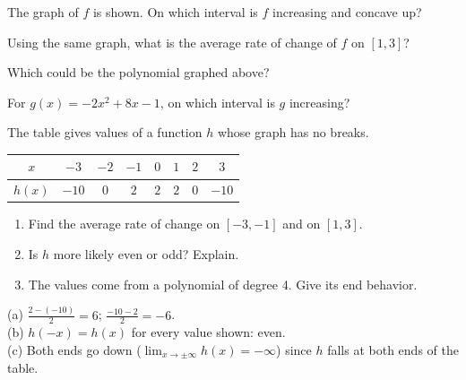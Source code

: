 \begin{exo}{}
The graph of $f$ is shown. On which interval is $f$ increasing and concave up?
\end{exo}
\begin{exo}{}
Using the same graph, what is the average rate of change of $f$ on $[1,3]$?
\end{exo}
\begin{exo}[1.5]{}
Which could be the polynomial graphed above?
\end{exo}
\begin{exo}[1.3]{}
For $g(x)=-2x^2+8x-1$, on which interval is $g$ increasing?
\end{exo}
\begin{exo}{}
The table gives values of a function $h$ whose graph has no breaks.
\begin{center}\begin{tabular}{c|ccccccc}$x$&$-3$&$-2$&$-1$&$0$&$1$&$2$&$3$\\\hline$h(x)$&$-10$&$0$&$2$&$2$&$2$&$0$&$-10$\end{tabular}\end{center}
\begin{enumerate}[label=(\alph*)]
\item Find the average rate of change on $[-3,-1]$ and on $[1,3]$.
\item Is $h$ more likely even or odd? Explain.
\item The values come from a polynomial of degree 4. Give its end behavior.
\end{enumerate}
\begin{solution}
(a) $\frac{2-(-10)}{2}=6$; $\frac{-10-2}{2}=-6$.\\
(b) $h(-x)=h(x)$ for every value shown: even.\\
(c) Both ends go down ($\lim_{x\to\pm\infty}h(x)=-\infty$) since $h$ falls at both ends of the table.
\end{solution}
\end{exo}

